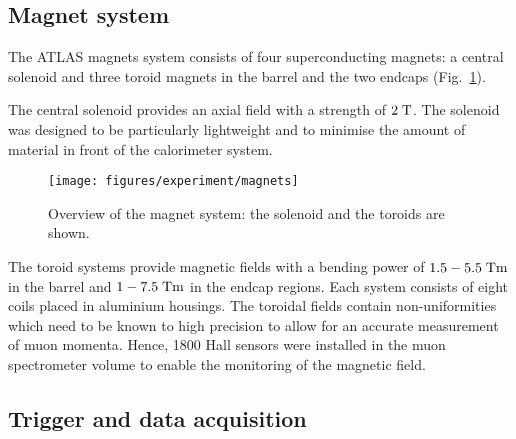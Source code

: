\subsection{Magnet system}
\label{sec:magnets}

The ATLAS magnets system consists of four superconducting
magnets: a central solenoid and three toroid magnets in the barrel and the
two endcaps (Fig.~\ref{fig:magnets}).

The central solenoid provides an axial field with a strength of \mbox{$2 \; \mathrm{T}$}.
The solenoid was designed to be particularly lightweight and to
minimise the amount of material in front of the calorimeter system.

\begin{figure}[h]
\begin{center}
\texttt{[image: figures/experiment/magnets]}
\caption[Overview of the magnet system]{
  Overview of the magnet system:
  the solenoid and the toroids are shown.}
\label{fig:magnets}
\end{center}
\end{figure}

The toroid systems provide magnetic fields with a bending power
of \mbox{$1.5 - 5.5 \; \mathrm{Tm}$} in the barrel and \mbox{$1 - 7.5 \; \mathrm{Tm}$} in the endcap regions.
Each system consists of eight coils placed in aluminium housings.
The toroidal fields contain non-uniformities which need to be known to
high precision to allow for an accurate measurement of muon momenta.
Hence, 1800 Hall sensors were installed in the muon spectrometer 
volume to enable the monitoring of the magnetic field.


\subsection{Trigger and data acquisition}
\label{sec:triggerDAQ}


